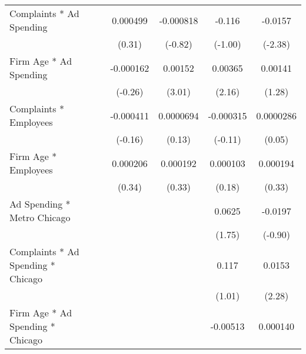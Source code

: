 {\begin{longtable}{l*{6}{c}}
\addlinespace
Complaints * Ad Spending&                     &                     &    0.000499         &   -0.000818         &      -0.116         &     -0.0157\sym{**} \\
                    &                     &                     &      (0.31)         &     (-0.82)         &     (-1.00)         &     (-2.38)         \\
\addlinespace
Firm Age * Ad Spending&                     &                     &   -0.000162         &     0.00152\sym{***}&     0.00365\sym{**} &     0.00141         \\
                    &                     &                     &     (-0.26)         &      (3.01)         &      (2.16)         &      (1.28)         \\
\addlinespace
Complaints * Employees&                     &                     &   -0.000411         &   0.0000694         &   -0.000315         &   0.0000286         \\
                    &                     &                     &     (-0.16)         &      (0.13)         &     (-0.11)         &      (0.05)         \\
\addlinespace
Firm Age * Employees&                     &                     &    0.000206         &    0.000192         &    0.000103         &    0.000194         \\
                    &                     &                     &      (0.34)         &      (0.33)         &      (0.18)         &      (0.33)         \\
\addlinespace
Ad Spending * Metro Chicago&                     &                     &                     &                     &      0.0625\sym{*}  &     -0.0197         \\
                    &                     &                     &                     &                     &      (1.75)         &     (-0.90)         \\
\addlinespace
Complaints * Ad Spending * Chicago&                     &                     &                     &                     &       0.117         &      0.0153\sym{**} \\
                    &                     &                     &                     &                     &      (1.01)         &      (2.28)         \\
\addlinespace
Firm Age * Ad Spending * Chicago&                     &                     &                     &                     &    -0.00513\sym{***}&    0.000140         \\

\end{longtable}}
